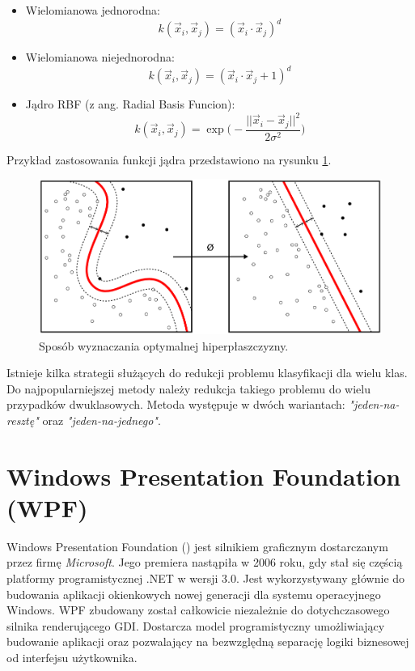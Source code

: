 \begin{itemize}
	\item Wielomianowa jednorodna: 
	\begin{equation}
	k(\vec{x}_i,\vec{x}_j) = (\vec{x}_i \cdot \vec{x}_j)^d
	\end{equation}
	\item Wielomianowa niejednorodna:
	\begin{equation}
	k(\vec{x}_i,\vec{x}_j) = (\vec{x}_i \cdot \vec{x}_j + 1)^d
	\end{equation}
	\item Jądro RBF (z ang. Radial Basis Funcion):
	\begin{equation}
	k(\vec{x}_i,\vec{x}_j) = \exp\bigg( -\frac{||\vec{x}_i - \vec{x}_j||^2}{2\sigma^2}\bigg)
	\end{equation}
\end{itemize}
Przykład zastosowania funkcji jądra przedstawiono na rysunku \ref{im: KernelMachine}.
\begin{figure}[h]
	\includegraphics[width=12cm]{KernelMachine}
	\centering
	\caption{Sposób wyznaczania optymalnej hiperpłaszczyzny.}
	\label{im: KernelMachine}
\end{figure}

Istnieje kilka strategii służących do redukcji problemu klasyfikacji dla wielu klas. Do najpopularniejszej metody należy redukcja takiego problemu do wielu przypadków dwuklasowych. Metoda występuje w dwóch wariantach: \textit{"jeden-na-resztę"} oraz \textit{"jeden-na-jednego"}. 


\section{Windows Presentation Foundation (WPF)}
\label{sec: WPF}
Windows Presentation Foundation (\cite{Wpf}) jest silnikiem graficznym dostarczanym przez firmę \textit{Microsoft}. Jego premiera nastąpiła w 2006 roku, gdy stał się częścią platformy programistycznej .NET w wersji 3.0.  Jest wykorzystywany głównie do budowania aplikacji okienkowych nowej generacji dla systemu operacyjnego Windows. WPF zbudowany został całkowicie niezależnie do dotychczasowego silnika renderującego GDI. Dostarcza model programistyczny umożliwiający budowanie aplikacji oraz pozwalający na bezwzględną separację logiki biznesowej od interfejsu użytkownika. 

